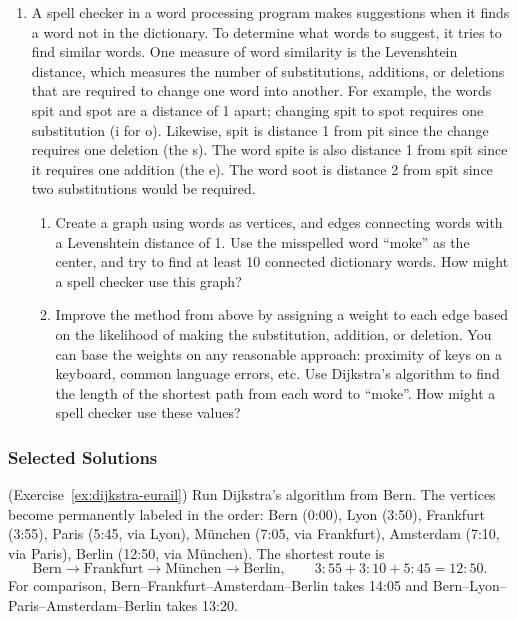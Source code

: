 \begin{enumerate}[start=18]
\item	A spell checker in a word processing program makes suggestions when it finds a word not in the dictionary.  To determine what words to suggest, it tries to find similar words.  One measure of word similarity is the Levenshtein distance, which measures the number of substitutions, additions, or deletions that are required to change one word into another.   For example, the words spit and spot are a distance of 1 apart; changing spit to spot requires one substitution (i for o).   Likewise, spit is distance 1 from pit since the change requires one deletion (the s).  The word spite is also distance 1 from spit since it requires one addition (the e).  The word soot is distance 2 from spit since two substitutions would be required.
\begin{enumerate}
\item	Create a graph using words as vertices, and edges connecting words with a Levenshtein distance of 1.  Use the misspelled word ``moke'' as the center, and try to find at least 10 connected dictionary words.  How might a spell checker use this graph?   
\item	Improve the method from above by assigning a weight to each edge based on the likelihood of making the substitution, addition, or deletion.  You can base the weights on any reasonable approach:  proximity of keys on a keyboard, common language errors, etc.  Use Dijkstra's algorithm to find the length of the shortest path from each word to ``moke''.  How might a spell checker use these values?   \\
\end{enumerate}

\end{enumerate}

\subsubsection*{Selected Solutions}

\begin{solution}(Exercise~\ref{ex:dijkstra-eurail})
Run Dijkstra's algorithm from Bern.  The vertices become permanently labeled in the order: Bern (0:00), Lyon (3:50), Frankfurt (3:55), Paris (5:45, via Lyon), M\"unchen (7:05, via Frankfurt), Amsterdam (7:10, via Paris), Berlin (12:50, via M\"unchen).  The shortest route is
\[
\text{Bern} \to \text{Frankfurt} \to \text{M\"unchen} \to \text{Berlin},
\qquad 3{:}55 + 3{:}10 + 5{:}45 = 12{:}50.
\]
For comparison, Bern--Frankfurt--Amsterdam--Berlin takes 14:05 and Bern--Lyon--Paris--Amsterdam--Berlin takes 13:20.
\end{solution}

